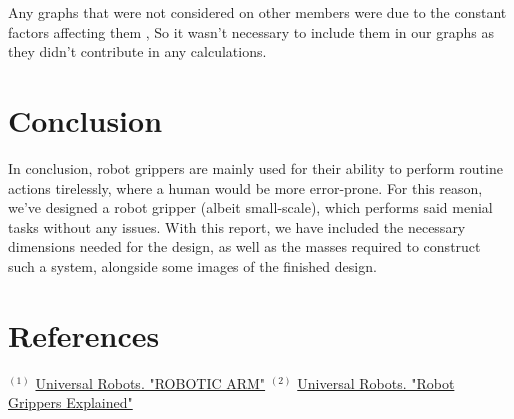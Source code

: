 \documentclass{article}
\begin{document}
Any graphs that were not considered on other members were due to the constant factors affecting them
, So it wasn't necessary to include them in our graphs as they didn't contribute in any calculations.

\newpage
\section*{Conclusion}
In conclusion, robot grippers are mainly used for their ability to perform routine actions tirelessly,
where a human would be more error-prone. For this reason, we've designed a robot gripper (albeit small-scale), 
which performs said menial tasks without any issues. With this report, we have included the necessary dimensions 
needed for the design, as well as the masses required to construct such a system, alongside some images
of the finished design.

\newpage
\section*{References}
$^{(1)}$ \href{https://www.universal-robots.com/in/blog/robotic-arm/}{Universal Robots. "ROBOTIC ARM"}
$^{(2)}$ \href{https://www.universal-robots.com/blog/robot-grippers-explained/}{Universal Robots. "Robot Grippers Explained"}
\end{document}
